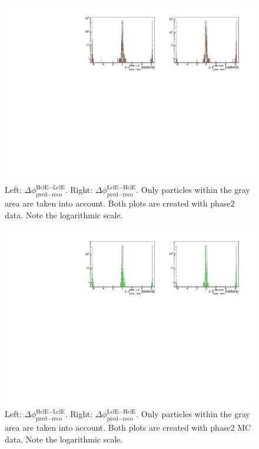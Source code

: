 \documentclass[a4paper,11pt,twosided,final,german,openbib,pdftex,listof=totoc,bibliography=totoc]{scrbook}
\begin{document}
\begin{appendix}
\begin{figure}[h!]
	\centering
	\includegraphics[width=\textwidth]{Plots/master/sb2b_Data_0.pdf}
	\caption[b2bClusterPhi - clusterPhi For Phase2 Data (Whole Range)]{Left: $\Delta \phi _{\textrm{pred} - \textrm{reco}}^{\textrm{HclE}-\textrm{LclE}}$. Right:  $\Delta \phi _{\textrm{pred} - \textrm{reco}}^{\textrm{LclE}-\textrm{HclE}}$. Only particles within the gray area are taken into account. Both plots are created with phase2 data. Note the logarithmic scale.}
	\label{fig:b2bData_Whole}
\end{figure}






\begin{figure}[!htbp]
	\centering
	\includegraphics[width=\textwidth]{Plots/master/sb2b_MC_0.pdf}
	\caption[b2bClusterPhi - clusterPhi For Phase2 MC (Whole Range)]{Left: $\Delta \phi _{\textrm{pred} - \textrm{reco}}^{\textrm{HclE}-\textrm{LclE}}$. Right:  $\Delta \phi _{\textrm{pred} - \textrm{reco}}^{\textrm{LclE}-\textrm{HclE}}$. Only particles within the gray area are taken into account. Both plots are created with phase2 MC data. Note the logarithmic scale.}
	\label{fig:b2bMC_Whole}
\end{figure}
\newpage




\end{appendix}
\end{document}
